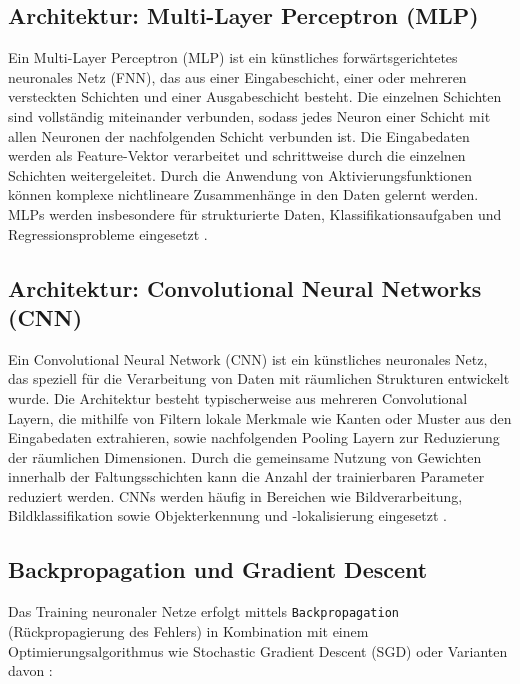 \subsection{Architektur: Multi-Layer Perceptron (MLP)}\label{sub:mlp}

Ein Multi-Layer Perceptron (MLP) ist ein künstliches forwärtsgerichtetes neuronales Netz (FNN), das aus einer Eingabeschicht, einer oder mehreren versteckten Schichten und einer Ausgabeschicht besteht. Die einzelnen Schichten sind vollständig miteinander verbunden, sodass jedes Neuron einer Schicht mit allen Neuronen der nachfolgenden Schicht verbunden ist. Die Eingabedaten werden als Feature-Vektor verarbeitet und schrittweise durch die einzelnen Schichten weitergeleitet. Durch die Anwendung von Aktivierungsfunktionen können komplexe nichtlineare Zusammenhänge in den Daten gelernt werden. MLPs werden insbesondere für strukturierte Daten, Klassifikationsaufgaben und Regressionsprobleme eingesetzt \cite[S. ~90]{burkovMachineLearningKompakt2019}.

\subsection{Architektur: Convolutional Neural Networks (CNN)}\label{sub:cnn}

Ein Convolutional Neural Network (CNN) ist ein künstliches neuronales Netz, das speziell für die Verarbeitung von Daten mit räumlichen Strukturen entwickelt wurde. Die Architektur besteht typischerweise aus mehreren Convolutional Layern, die mithilfe von Filtern lokale Merkmale wie Kanten oder Muster aus den Eingabedaten extrahieren, sowie nachfolgenden Pooling Layern zur Reduzierung der räumlichen Dimensionen. Durch die gemeinsame Nutzung von Gewichten innerhalb der Faltungsschichten kann die Anzahl der trainierbaren Parameter reduziert werden. CNNs werden häufig in Bereichen wie Bildverarbeitung, Bildklassifikation sowie Objekterkennung und -lokalisierung eingesetzt \cite[S. ~95]{burkovMachineLearningKompakt2019}.

\subsection{Backpropagation und Gradient Descent}\label{sub:backpropagation}

Das Training neuronaler Netze erfolgt mittels \texttt{Backpropagation} (Rückpropagierung des Fehlers) in Kombination mit einem Optimierungsalgorithmus wie Stochastic Gradient Descent (SGD) oder Varianten davon \cite[S. ~217 ff.]{goodfellowDeepLearning2016}:

